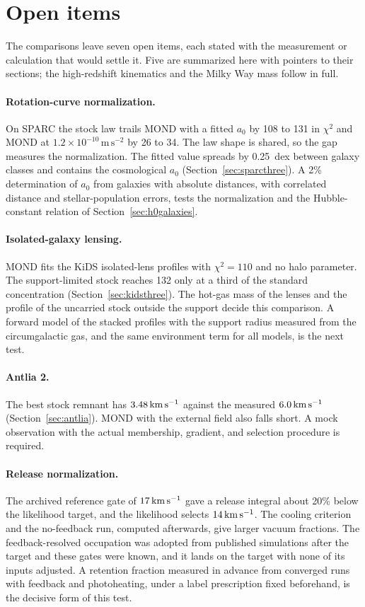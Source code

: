 \section{Open items}
\label{sec:open}

The comparisons leave seven open items, each stated with the measurement
or calculation that would settle it. Five are summarized here with
pointers to their sections; the high-redshift kinematics and the Milky Way
mass follow in full.

\paragraph{Rotation-curve normalization.} On SPARC the stock law trails
MOND with a fitted $a_0$ by 108 to 131 in $\chi^2$ and MOND at
$1.2\times10^{-10}\,\mathrm{m\,s^{-2}}$ by 26 to 34. The law shape is
shared, so the gap measures the normalization. The fitted value spreads
by 0.25~dex between galaxy classes and contains the cosmological $a_0$
(Section~\ref{sec:sparcthree}). A 2\% determination of $a_0$ from galaxies
with absolute distances, with correlated distance and stellar-population
errors, tests the normalization and the Hubble-constant relation of
Section~\ref{sec:h0galaxies}.

\paragraph{Isolated-galaxy lensing.} MOND fits the KiDS isolated-lens
profiles with $\chi^2=110$ and no halo parameter. The support-limited stock
reaches 132 only at a third of the standard concentration
(Section~\ref{sec:kidsthree}). The hot-gas mass of the lenses and the
profile of the uncarried stock outside the support decide this comparison.
A forward model of the stacked profiles with the support radius measured
from the circumgalactic gas, and the same environment term for all models,
is the next test.

\paragraph{Antlia 2.} The best stock remnant has $3.48\,\mathrm{km\,s^{-1}}$ against the
measured $6.0\,\mathrm{km\,s^{-1}}$ (Section~\ref{sec:antlia}). MOND with the external
field also falls short. A mock observation with the actual membership,
gradient, and selection procedure is required.

\paragraph{Release normalization.} The archived reference gate of
$17\,\mathrm{km\,s^{-1}}$ gave a release integral about 20\% below the likelihood target,
and the likelihood selects $14\,\mathrm{km\,s^{-1}}$. The cooling criterion and the
no-feedback run, computed afterwards, give larger vacuum fractions. The
feedback-resolved occupation was adopted from published simulations after
the target and these gates were known, and it lands on the target with
none of its inputs adjusted. A retention fraction measured in advance
from converged runs with feedback and photoheating, under a label prescription fixed beforehand, is the
decisive form of this test.

